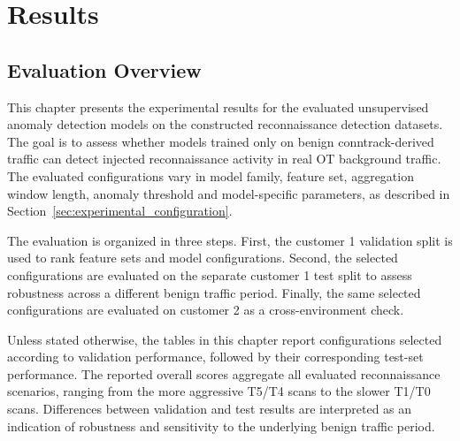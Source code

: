 \chapter{Results}
\label{ch:results}





\section{Evaluation Overview}




This chapter presents the experimental results for the evaluated unsupervised ano\-maly detection models on the constructed reconnaissance detection datasets. The goal is to assess whether models trained only on benign conntrack-derived traffic can detect injected reconnaissance activity in real OT background traffic. The evaluated configurations vary in model family, feature set, aggregation window length, anomaly threshold and model-specific parameters, as described in Section~\ref{sec:experimental_configuration}.

The evaluation is organized in three steps. First, the customer 1 validation split is used to rank feature sets and model configurations. Second, the selected configurations are evaluated on the separate customer 1 test split to assess robustness across a different benign traffic period. Finally, the same selected configurations are evaluated on customer 2 as a cross-environment check.


Unless stated otherwise, the tables in this chapter report configurations selected according to validation performance, followed by their corresponding test-set performance.  The reported overall scores aggregate all evaluated reconnaissance scenarios, ranging from the more aggressive T5/T4 scans to the slower T1/T0 scans. Differences between validation and test results are interpreted as an indication of robustness and sensitivity to the underlying benign traffic period.



